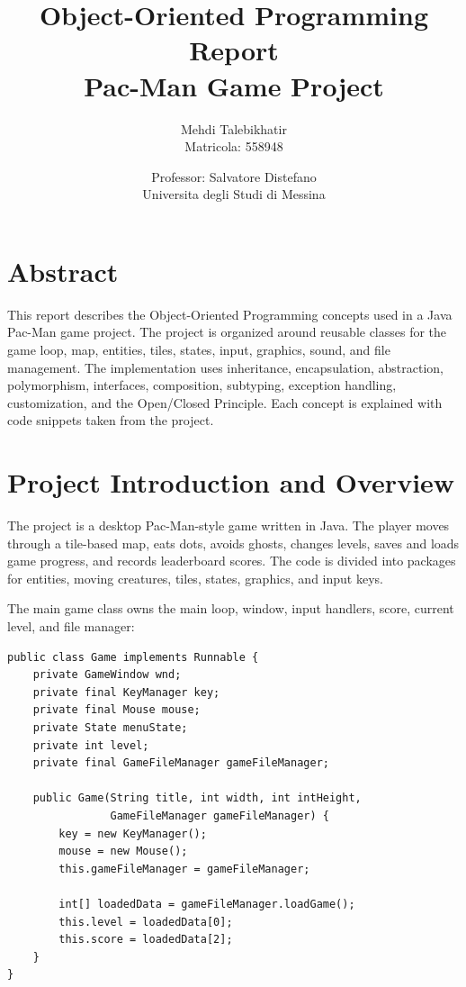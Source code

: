 \documentclass[12pt,a4paper]{article}
\title{\textbf{Object-Oriented Programming Report}\\Pac-Man Game Project}
\author{Mehdi Talebikhatir\\Matricola: 558948}
\date{Professor: Salvatore Distefano\\Universita degli Studi di Messina}
\begin{document}
\maketitle
\thispagestyle{empty}
\newpage

\tableofcontents
\newpage

\section{Abstract}

This report describes the Object-Oriented Programming concepts used in a Java Pac-Man game project. The project is organized around reusable classes for the game loop, map, entities, tiles, states, input, graphics, sound, and file management. The implementation uses inheritance, encapsulation, abstraction, polymorphism, interfaces, composition, subtyping, exception handling, customization, and the Open/Closed Principle. Each concept is explained with code snippets taken from the project.

\section{Project Introduction and Overview}

The project is a desktop Pac-Man-style game written in Java. The player moves through a tile-based map, eats dots, avoids ghosts, changes levels, saves and loads game progress, and records leaderboard scores. The code is divided into packages for entities, moving creatures, tiles, states, graphics, and input keys.

The main game class owns the main loop, window, input handlers, score, current level, and file manager:

\begin{lstlisting}
public class Game implements Runnable {
    private GameWindow wnd;
    private final KeyManager key;
    private final Mouse mouse;
    private State menuState;
    private int level;
    private final GameFileManager gameFileManager;

    public Game(String title, int width, int intHeight,
                GameFileManager gameFileManager) {
        key = new KeyManager();
        mouse = new Mouse();
        this.gameFileManager = gameFileManager;

        int[] loadedData = gameFileManager.loadGame();
        this.level = loadedData[0];
        this.score = loadedData[2];
    }
}
\end{lstlisting}
\end{document}
